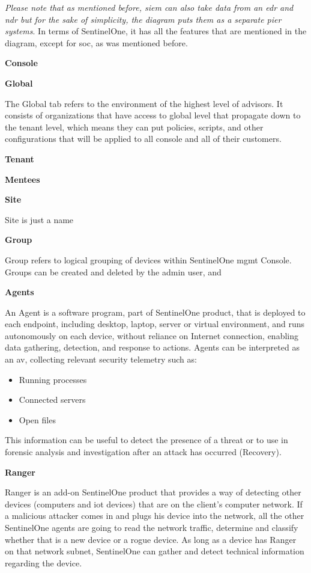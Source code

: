\begin{multicols}{2}
      \textit{Please note that as mentioned before, \acrshort{siem} can also take data from an \acrshort{edr} and \acrshort{ndr} but for
            the sake of simplicity, the diagram puts them as a separate pier systems}. In terms of SentinelOne, it has all the features that
      are mentioned in the diagram, except for \acrshort{soc}, as was mentioned before.

      \textbf{Console}

      \textbf{Global}

      The Global tab refers to the environment of the highest level of advisors. It consists of organizations that have access to global level
      that propagate down to the tenant level, which means they can put policies, scripts, and other configurations that will be applied to all
      console and all of their customers.

      \textbf{Tenant}

      \textbf{Mentees}

      \textbf{Site}

      Site is just a name

      \textbf{Group}

      Group refers to logical grouping of devices within SentinelOne \acrshort{mgmt} Console. Groups can be created and deleted by the
      admin user, and

      \textbf{Agents}

      An Agent is a software program, part of SentinelOne product, that is deployed to each endpoint, including desktop, laptop,
      server or virtual environment, and runs autonomously on each device, without reliance on Internet connection, enabling data
      gathering, detection, and response to actions. Agents can be interpreted as an \acrshort{av}, collecting relevant security
      telemetry such as:
      \begin{itemize}
            \item Running processes
            \item Connected servers
            \item Open files
      \end{itemize}
      This information can be useful to detect the presence of a threat or to use in forensic analysis and investigation after
      an attack has occurred (Recovery).

      \textbf{Ranger}

      Ranger is an add-on SentinelOne product that provides a way of detecting other devices (computers and
      \acrshort{iot} devices) that are on the client's computer network. If a malicious attacker comes in and plugs his device
      into the network, all the other SentinelOne agents are going to read the network traffic, determine and classify whether
      that is a new device or a rogue device. As long as a device has Ranger on that network subnet, SentinelOne can gather and
      detect technical information regarding the device.


\end{multicols}
